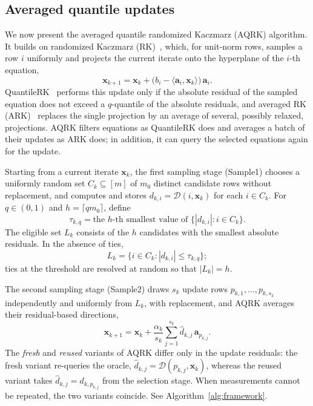 \documentclass[pdflatex,sn-mathphys-num]{sn-jnl}
\theoremstyle{thmstyleone}
\theoremstyle{thmstylethree}
\newcommand{\vx}{\mathbf{x}}
\newcommand{\va}{\mathbf{a}}
\begin{document}
\subsection{Averaged quantile updates}
\label{subsec:aqrk}
We now present the averaged quantile randomized Kaczmarz (AQRK) algorithm. It
builds on randomized Kaczmarz (RK)~\cite{strohmer2007randomized}, which, for
unit-norm rows, samples a row $i$ uniformly and projects the current iterate
onto the hyperplane of the $i$-th equation,
\[
\vx_{k+1}=\vx_k+\bigl(b_i-\langle\va_i,\vx_k\rangle\bigr)\,\va_i .
\]
QuantileRK~\cite{haddock2022quantilebased} performs this update only if the
absolute residual of the sampled equation does not exceed a $q$-quantile of
the absolute residuals, and averaged RK (ARK)~\cite{moorman2021randomized}
replaces the single projection by an average of several, possibly relaxed,
projections. AQRK filters equations as QuantileRK does and averages a batch of
their updates as ARK does; in addition, it can query the selected equations
again for the update.

Starting from a current iterate $\vx_k$, the first sampling stage (Sample1)
chooses a uniformly random set $C_k\subseteq[m]$ of $m_0$ distinct candidate
rows without replacement, and computes and stores
$d_{k,i}=\mathcal D(i,\vx_k)$ for each $i\in C_k$.
For $q\in(0,1)$ and $h=\lceil qm_0\rceil$, define
\begin{equation}
\label{eq:tau-notation}
    \tau_{k,q}=\text{the $h$-th smallest value of }
        \{|d_{k,i}|:i\in C_k\}.
\end{equation}
The eligible set $L_k$ consists of the $h$ candidates with the smallest
absolute residuals. In the absence of ties,
\begin{equation}
\label{eq:admissible}
    L_k=\{i\in C_k:|d_{k,i}|\le\tau_{k,q}\};
\end{equation}
ties at the threshold are resolved at random so that $|L_k|=h$.

The second sampling stage (Sample2) draws $s_k$ update rows
$p_{k,1},\ldots,p_{k,s_k}$ independently and uniformly from $L_k$, with
replacement, and AQRK averages their residual-based directions,
\begin{equation}
\label{eq:aqrk-update}
    \vx_{k+1}=\vx_k+\frac{\alpha_k}{s_k}\sum_{j=1}^{s_k}
        \widehat d_{k,j}\,\va_{p_{k,j}}.
\end{equation}
The \emph{fresh} and \emph{reused} variants of AQRK differ only in the update
residuals: the fresh variant re-queries the oracle,
$\widehat d_{k,j}=\mathcal D(p_{k,j},\vx_k)$, whereas the reused variant takes
$\widehat d_{k,j}=d_{k,p_{k,j}}$ from the selection stage. When measurements
cannot be repeated, the two variants coincide. See Algorithm~\ref{alg:framework}.
\end{document}
